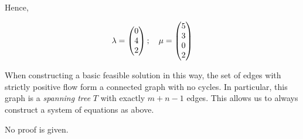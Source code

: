 \noindent Hence,

\[
	\vb\lambda = \begin{pmatrix}
		0 \\ 4 \\ 2
	\end{pmatrix};\quad \vb\mu = \begin{pmatrix}
		5 \\3\\0\\2
	\end{pmatrix}
\]

\begin{theorem}
	When constructing a basic feasible solution in this way, the set of edges with strictly positive flow form a connected graph with no cycles.
	In particular, this graph is a \textit{spanning tree} \( T \) with exactly \( m + n - 1 \) edges.
    This allows us to always construct a system of equations as above.
\end{theorem}
\noindent No proof is given.

